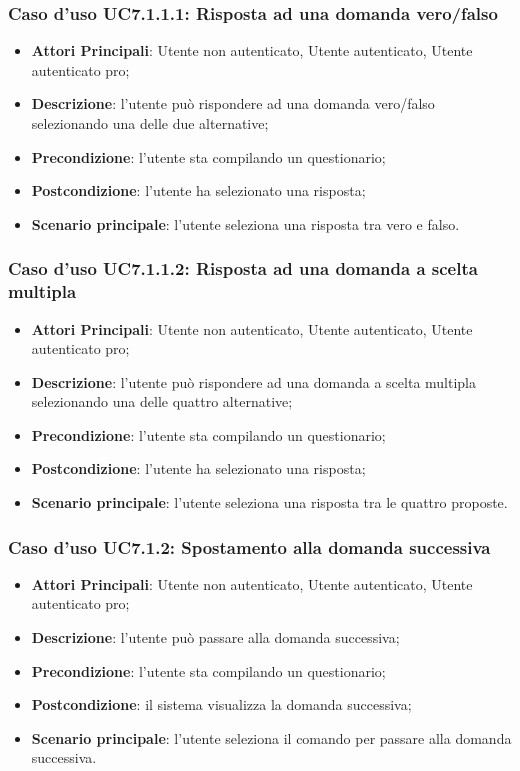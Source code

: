 \subsubsection{Caso d'uso UC7.1.1.1: Risposta ad una domanda vero/falso}
\label{UC7.1.1.1}
\begin{itemize}
\item\textbf{Attori Principali}: Utente non autenticato, Utente autenticato, Utente autenticato pro;
\item\textbf{Descrizione}: l'utente può rispondere ad una domanda vero/falso selezionando una delle due alternative;
\item\textbf{Precondizione}: l'utente sta compilando un questionario;
\item\textbf{Postcondizione}: l'utente ha selezionato una risposta;
\item\textbf{Scenario principale}: l'utente seleziona una risposta tra vero e falso.
\end{itemize}

\subsubsection{Caso d'uso UC7.1.1.2: Risposta ad una domanda a scelta multipla}
\label{UC7.1.1.2}
\begin{itemize}
\item\textbf{Attori Principali}: Utente non autenticato, Utente autenticato, Utente autenticato pro;
\item\textbf{Descrizione}: l'utente può rispondere ad una domanda a scelta multipla selezionando una delle quattro alternative;
\item\textbf{Precondizione}: l'utente sta compilando un questionario;
\item\textbf{Postcondizione}: l'utente ha selezionato una risposta;
\item\textbf{Scenario principale}: l'utente seleziona una risposta tra le quattro proposte.
\end{itemize}

\subsubsection{Caso d'uso UC7.1.2: Spostamento alla domanda successiva}
\label{UC7.1.2}
\begin{itemize}
\item\textbf{Attori Principali}: Utente non autenticato, Utente autenticato, Utente autenticato pro;
\item\textbf{Descrizione}: l'utente può passare alla domanda successiva;
\item\textbf{Precondizione}: l'utente sta compilando un questionario;
\item\textbf{Postcondizione}: il sistema visualizza la domanda successiva;
\item\textbf{Scenario principale}: l'utente seleziona il comando per passare alla domanda successiva.
\end{itemize}

